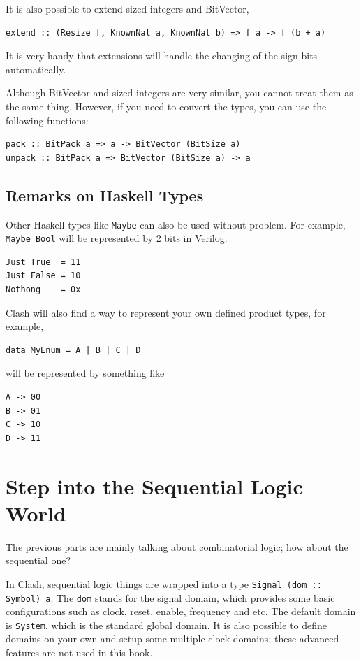 \documentclass[a4paper,12pt, oneside]{book}
\begin{document}
It is also possible to extend sized integers and BitVector,
\begin{verbatim}
extend :: (Resize f, KnownNat a, KnownNat b) => f a -> f (b + a)
\end{verbatim}
It is very handy that extensions will handle the changing of the sign bits automatically.

Although BitVector and sized integers are very similar, you cannot treat them as the same thing. However, if you need to convert the types, you can use the following functions:
\begin{verbatim}
pack :: BitPack a => a -> BitVector (BitSize a)
unpack :: BitPack a => BitVector (BitSize a) -> a
\end{verbatim}
\subsection{Remarks on Haskell Types}
Other Haskell types like \texttt{Maybe} can also be used without problem. For example, \texttt{Maybe Bool} will be represented by 2 bits in Verilog.
\begin{verbatim}
Just True  = 11
Just False = 10
Nothong    = 0x
\end{verbatim}
Clash will also find a way to represent your own defined product types, for example,
\begin{verbatim}
data MyEnum = A | B | C | D
\end{verbatim}
will be represented by something like
\begin{verbatim}
A -> 00
B -> 01
C -> 10
D -> 11
\end{verbatim}

\section{Step into the Sequential Logic World} 
The previous parts are mainly talking about combinatorial logic; how about the sequential one? 

In Clash, sequential logic things are wrapped into a type \texttt{Signal (dom :: Symbol) a}.
The \texttt{dom} stands for the signal domain, which provides some basic configurations such as
clock, reset, enable, frequency and etc. The default domain is \texttt{System}, which is the standard global domain. It is also possible to define domains on your own and setup some multiple clock domains; these advanced features are not used in this book.
\end{document}
